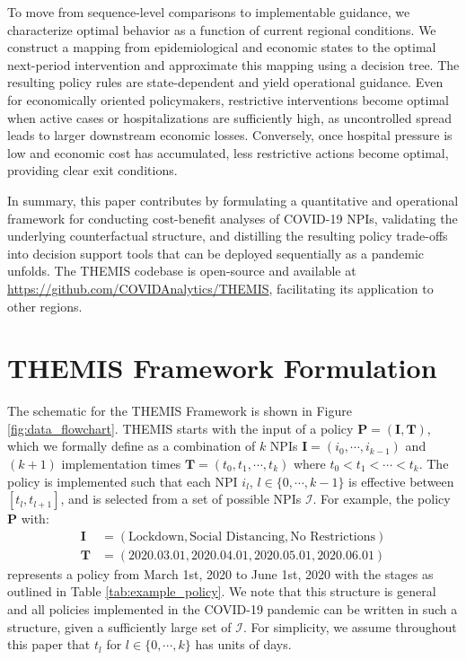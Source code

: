 \documentclass[msom,blindrev]{informs3} %
\newcommand{\rev}[1]{{\color{blue}#1}}
\begin{document}
To move from sequence-level comparisons to implementable guidance, we characterize optimal behavior as a function of current regional conditions. We construct a mapping from epidemiological and economic states to the optimal next-period intervention and approximate this mapping using a decision tree. The resulting policy rules are state-dependent and yield operational guidance. Even for economically oriented policymakers, restrictive interventions become optimal when active cases or hospitalizations are sufficiently high, as uncontrolled spread leads to larger downstream economic losses. Conversely, once hospital pressure is low and economic cost has accumulated, less restrictive actions become optimal, providing clear exit conditions.

\rev{In summary, this paper contributes by formulating a quantitative and operational framework for conducting cost-benefit analyses of COVID-19 NPIs, validating the underlying counterfactual structure, and distilling the resulting policy trade-offs into decision support tools that can be deployed sequentially as a pandemic unfolds. The THEMIS codebase is open-source and available at \url{https://github.com/COVIDAnalytics/THEMIS}, facilitating its application to other regions.}


\section{THEMIS Framework Formulation}
\label{sec:model}

The schematic for the THEMIS Framework is shown in Figure \ref{fig:data_flowchart}. THEMIS starts with the input of a policy $\bm{P}= (\bm{I},\bm{T})$, which we formally define as a combination of $k$ NPIs $\bm{I}=(i_0,\cdots,i_{k-1})$ and $(k+1)$ implementation times $\bm{T}=(t_0,t_1,\cdots,t_k)$ where $t_0<t_1<\cdots<t_k$. The policy is implemented such that each NPI $i_l$, $l \in \{0,\cdots,k-1\}$ is effective between $[t_l,t_{l+1}]$, and is selected from a set of possible NPIs $\mathcal{I}$. For example, the policy $\bm{P}$ with:
\begin{align*}
    \bm{I} &= (\text{Lockdown}, \text{Social Distancing}, \text{No Restrictions})\\
    \bm{T} &=(2020.03.01, 2020.04.01, 2020.05.01, 2020.06.01)
\end{align*}
represents a policy from March 1st, 2020 to June 1st, 2020 with the stages as outlined in Table \ref{tab:example_policy}. We note that this structure is general and all policies implemented in the COVID-19 pandemic can be written in such a structure, given a sufficiently large set of $\mathcal{I}$. For simplicity, we assume throughout this paper that $t_l$ for $l\in \{0,\cdots,k\}$ has units of days.
\end{document}
